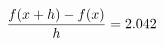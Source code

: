 \documentclass[preview]{standalone}
\begin{document}
\begin{align*}
\special{dvisvgm:raw <g id='unique000'>}\frac{f(x+h)-f(x)}{h} = 2.042\special{dvisvgm:raw </g>}
\end{align*}
\end{document}
